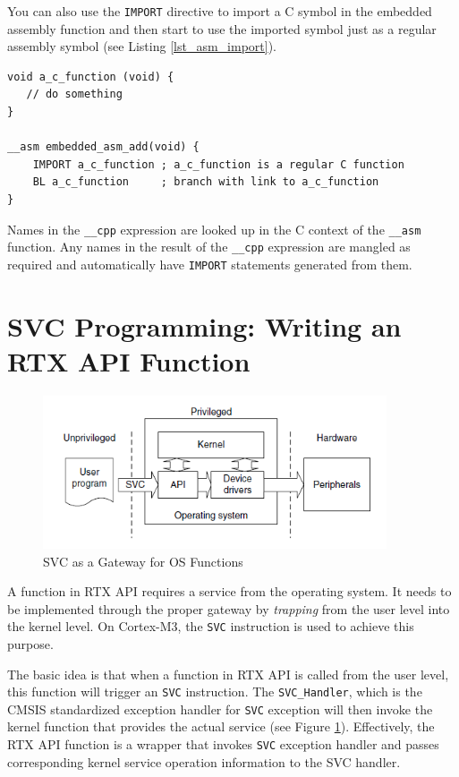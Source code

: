You can also use the \verb|IMPORT| directive to import a C symbol in the embedded assembly function and then start to use the imported symbol just as a regular assembly symbol (see Listing \ref{lst_asm_import}).
\begin{lstlisting}[style=asm, caption={Example of using IMPORT directive to import a C symbol.}, label=lst_asm_import]
void a_c_function (void) {
   // do something 
}

__asm embedded_asm_add(void) {
    IMPORT a_c_function ; a_c_function is a regular C function
    BL a_c_function     ; branch with link to a_c_function
}
\end{lstlisting}

Names in the \verb|__cpp| expression are looked up in the C context of the \verb|__asm| function. Any names in the result of the \verb|__cpp| expression are mangled as required and automatically have \verb|IMPORT| statements generated from them.

\section{SVC Programming: Writing an RTX API Function}
\label{sec_svc}
\begin{figure}[ht]
\centerline{\includegraphics[width=4in]{figure/svc_gateway}}
\caption {SVC as a Gateway for OS Functions \cite{yiu2009definitive}}
\label{fig_svc_gateway}
\end{figure}
A function in RTX API requires a service from the operating system. It needs to be implemented through the proper gateway by {\em trapping} from the user level into the kernel level. On Cortex-M3, the \verb+SVC+ instruction is used to achieve this purpose.  

The basic idea is that when a function in RTX API is called from the user level, this function will trigger an \verb+SVC+ instruction. The \verb+SVC_Handler+, which is the CMSIS standardized exception handler for \verb+SVC+ exception will then invoke the kernel function that provides the actual service (see Figure \ref{fig_svc_gateway}). Effectively, the RTX API function is a wrapper that invokes \verb+SVC+ exception handler and passes corresponding kernel service operation information to the SVC handler.

